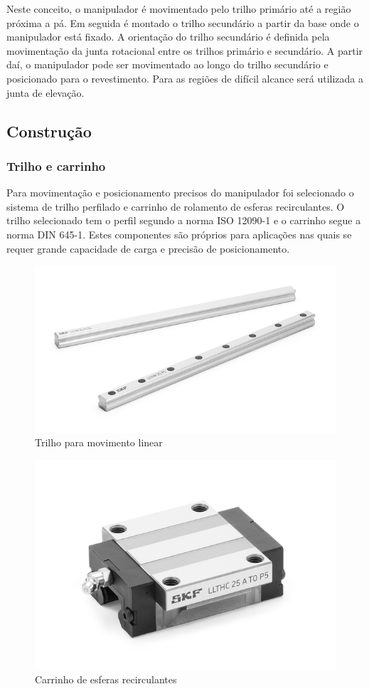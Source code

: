 Neste conceito, o manipulador é movimentado pelo trilho primário até a região
próxima a pá. Em seguida é montado o trilho secundário a partir da base onde o
manipulador está fixado. A orientação do trilho secundário é definida pela
movimentação da junta rotacional entre os trilhos primário e secundário. A
partir daí, o manipulador pode ser movimentado ao longo do trilho secundário e
posicionado para o revestimento. Para as regiões de difícil alcance será
utilizada a junta de elevação.

\subsection{Construção}

\subsubsection{Trilho e carrinho}

Para movimentação e posicionamento precisos do manipulador foi selecionado o
sistema de trilho perfilado e carrinho de rolamento de esferas recirculantes. 
O trilho selecionado tem o perfil segundo a norma ISO 12090-1 e o carrinho segue
a norma DIN 645-1. 
Estes componentes são próprios para aplicações nas quais se requer grande
capacidade de carga e precisão de posicionamento.

\begin{figure}[h!]
	\centering
	\includegraphics[width=0.7\columnwidth]{figs/construcao/trilho_LLT}
	\caption{Trilho para movimento linear}
    \label{fig::trilho}
\end{figure}

\begin{figure}[h!]
	\centering
	\includegraphics[width=0.7\columnwidth]{figs/construcao/carrinho}
	\caption{Carrinho de esferas recirculantes}
    \label{fig::carrinho}
\end{figure}

